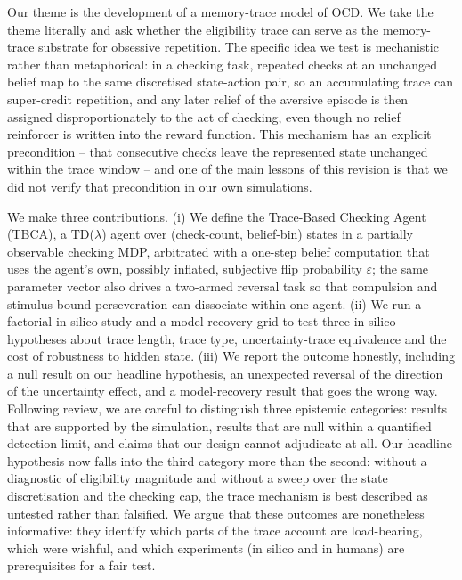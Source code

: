 \documentclass[11pt,a4paper]{article}
\begin{document}
Our theme is the development of a memory-trace model of OCD. We take the theme literally and ask whether the eligibility trace can serve as the memory-trace substrate for obsessive repetition. The specific idea we test is mechanistic rather than metaphorical: in a checking task, repeated checks at an unchanged belief map to the same discretised state-action pair, so an accumulating trace can super-credit repetition, and any later relief of the aversive episode is then assigned disproportionately to the act of checking, even though no relief reinforcer is written into the reward function. This mechanism has an explicit precondition -- that consecutive checks leave the represented state unchanged within the trace window -- and one of the main lessons of this revision is that we did not verify that precondition in our own simulations.

We make three contributions. (i) We define the Trace-Based Checking Agent (TBCA), a TD($\lambda$) agent over (check-count, belief-bin) states in a partially observable checking MDP, arbitrated with a one-step belief computation that uses the agent's own, possibly inflated, subjective flip probability $\varepsilon$; the same parameter vector also drives a two-armed reversal task so that compulsion and stimulus-bound perseveration can dissociate within one agent. (ii) We run a factorial in-silico study and a model-recovery grid to test three in-silico hypotheses about trace length, trace type, uncertainty-trace equivalence and the cost of robustness to hidden state. (iii) We report the outcome honestly, including a null result on our headline hypothesis, an unexpected reversal of the direction of the uncertainty effect, and a model-recovery result that goes the wrong way. Following review, we are careful to distinguish three epistemic categories: results that are supported by the simulation, results that are null within a quantified detection limit, and claims that our design cannot adjudicate at all. Our headline hypothesis now falls into the third category more than the second: without a diagnostic of eligibility magnitude and without a sweep over the state discretisation and the checking cap, the trace mechanism is best described as untested rather than falsified. We argue that these outcomes are nonetheless informative: they identify which parts of the trace account are load-bearing, which were wishful, and which experiments (in silico and in humans) are prerequisites for a fair test.
\end{document}
